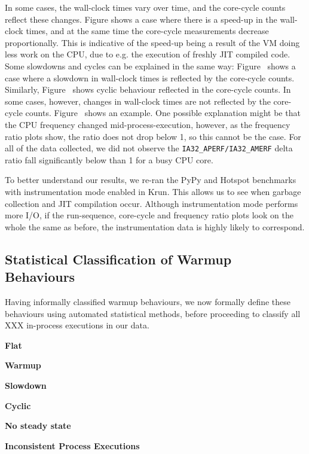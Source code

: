 \documentclass[preprint,numbers,10pt]{sigplanconf}
\newcommand{\krun}{Krun\xspace}
\begin{document}
In some cases, the wall-clock times vary over time, and the core-cycle counts
reflect these changes. Figure shows a case where there is a speed-up
in the wall-clock times, and at the same time the core-cycle measurements
decrease proportionally. This is indicative of the speed-up being a result of
the VM doing less work on the CPU, due to e.g. the execution of freshly JIT
compiled code. Some slowdowns and cycles can be explained in the same way:
Figure~ shows a case where a slowdown in wall-clock times is reflected
by the core-cycle counts. Similarly, Figure~ shows cyclic behaviour
reflected in the core-cycle counts. In some cases, however, changes in
wall-clock times are not reflected by the core-cycle counts. Figure~
shows an example. One possible explanation might be that the CPU frequency
changed mid-process-execution, however, as the frequency ratio plots show, the
ratio does not drop below 1, so this cannot be the case. For all of the data
collected, we did not observe the \texttt{IA32\_APERF/IA32\_AMERF} delta ratio
fall significantly below than 1 for a busy CPU core.

To better understand our results, we re-ran the PyPy and Hotspot benchmarks
with instrumentation mode enabled in \krun. This allows us to see when garbage
collection and JIT compilation occur. Although instrumentation mode performs
more I/O, if the run-sequence, core-cycle and frequency ratio plots look on the
whole the same as before, the instrumentation data is highly likely to
correspond. 


\subsection{Statistical Classification of Warmup Behaviours}

Having informally classified warmup behaviours, we now formally define these
behaviours using automated statistical methods, before proceeding to classify
all XXX in-process executions in our data.


\textbf{Flat}

\textbf{Warmup}

\textbf{Slowdown}

\textbf{Cyclic}

\textbf{No steady state}

\textbf{Inconsistent Process Executions}
\end{document}
